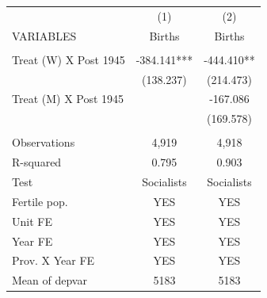 \begin{tabular}{lcc} \hline
 & (1) & (2) \\
VARIABLES & Births & Births \\ \hline
 &  &  \\
Treat (W) X Post 1945 & -384.141*** & -444.410** \\
 & (138.237) & (214.473) \\
Treat (M) X Post 1945 &  & -167.086 \\
 &  & (169.578) \\
 &  &  \\
Observations & 4,919 & 4,918 \\
R-squared & 0.795 & 0.903 \\
Test & Socialists & Socialists \\
Fertile pop. & YES & YES \\
Unit FE & YES & YES \\
Year FE & YES & YES \\
Prov. X Year FE & YES & YES \\
 Mean of depvar & 5183 & 5183 \\ \hline
\end{tabular}
